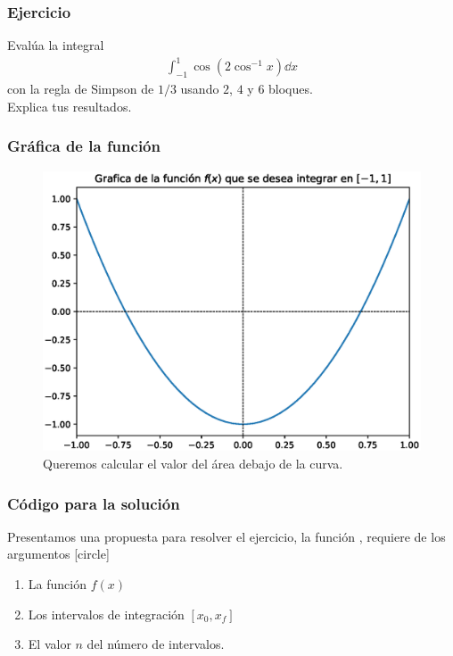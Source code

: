 \begin{frame}
\frametitle{Ejercicio}
Evalúa la integral
\begin{align*}
\int_{-1}^{1} \cos(2 \cos^{-1} x) \dd{x}
\end{align*}
con la regla de Simpson de $1/3$ usando $2$, $4$ y $6$ bloques.
\\
\bigskip
Explica tus resultados.
\end{frame}
\begin{frame}
\frametitle{Gráfica de la función}
\begin{figure}
    \centering
    \includegraphics[scale=0.5]{Imagenes/integral_1_3_simpson.eps}
    \caption{Queremos calcular el valor del área debajo de la curva.}
\end{figure}
\end{frame}
\begin{frame}
\frametitle{Código para la solución}
Presentamos una propuesta para resolver el ejercicio, la función , requiere de los argumentos
[circle]
\begin{enumerate}[<+->]
\item La función $f(x)$
\item Los intervalos de integración $[x_{0}, x_{f}]$
\item El valor $n$ del número de intervalos.
\end{enumerate}
\end{frame}
